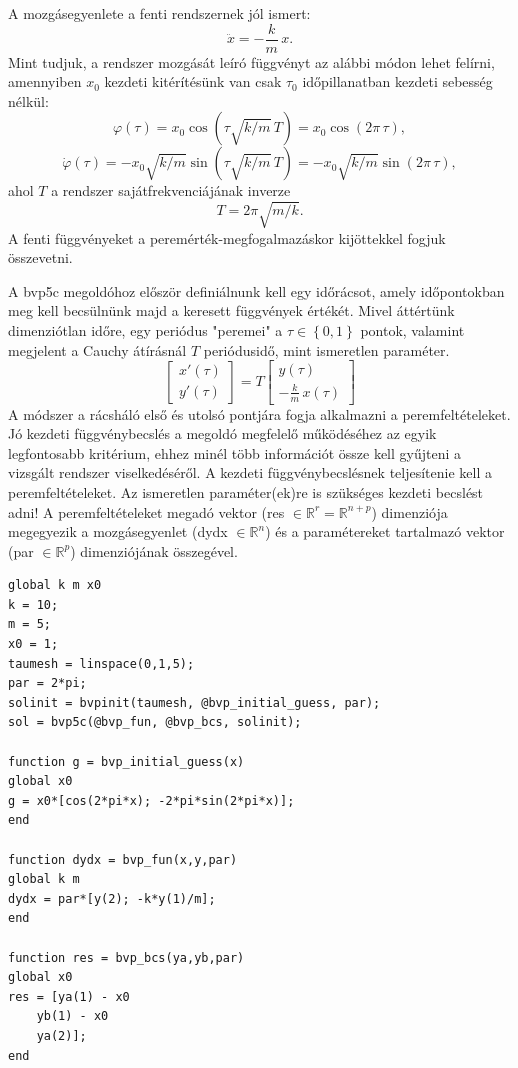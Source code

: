 A mozgásegyenlete a fenti rendszernek jól ismert:
\begin{equation}
\ddot{x}= -\frac{k}{m}\,x.
\end{equation}
Mint tudjuk, a rendszer mozgását leíró függvényt az alábbi módon lehet felírni, amennyiben $x_0$ kezdeti kitérítésünk van csak $\tau_0$ időpillanatban kezdeti sebesség nélkül:
\begin{equation}
\varphi(\tau) = x_0\cos\left(\tau\sqrt{k/m}\,T\right) = x_0\cos\left(2\pi\,\tau\right),
\end{equation}
\begin{equation}
\dot{\varphi}(\tau) = -x_0\sqrt{k/m}\sin\left(\tau\sqrt{k/m}\,T\right) = -x_0\sqrt{k/m}\sin\left(2\pi\,\tau\right),
\end{equation}
ahol $T$ a rendszer sajátfrekvenciájának inverze
\begin{equation}
T = 2\pi\sqrt{m/k}.
\end{equation}
A fenti függvényeket a peremérték-megfogalmazáskor kijöttekkel fogjuk összevetni.

A bvp5c megoldóhoz először definiálnunk kell egy időrácsot, amely i\-dő\-pon\-tok\-ban meg kell becsülnünk majd a keresett függvények értékét.
Mivel áttértünk dimenziótlan időre, egy periódus "peremei" a $\tau \in \left \{ 0,1 \right \}$ pontok, valamint megjelent a Cauchy átírásnál $T$ periódusidő, mint ismeretlen paraméter.
\begin{equation}
\begin{bmatrix}
x'(\tau) \\ y'(\tau)
\end{bmatrix} = 
T
\begin{bmatrix}
y(\tau) \\  -\frac{k}{m}\,x(\tau)
\end{bmatrix} 
\end{equation}
A módszer a rácsháló első és utolsó pontjára fogja alkalmazni a peremfeltételeket.
Jó kezdeti függvénybecslés a megoldó megfelelő működéséhez az egyik legfontosabb kritérium, ehhez minél több információt össze kell gyűjteni a vizsgált rendszer viselkedéséről.
A kezdeti függvénybecslésnek teljesítenie kell a peremfeltételeket.%
Az ismeretlen paraméter(ek)re is szükséges kezdeti becslést adni!
A peremfeltételeket megadó vektor (res $\in \mathbb{R}^r = \mathbb{R}^{n+p}$) dimenziója megegyezik a mozgásegyenlet (dydx $\in \mathbb{R}^n$) és a paramétereket tartalmazó vektor (par $\in \mathbb{R}^p$) dimenziójának összegével.
\begin{lstlisting}
global k m x0
k = 10;
m = 5;
x0 = 1;
taumesh = linspace(0,1,5);
par = 2*pi;
solinit = bvpinit(taumesh, @bvp_initial_guess, par);
sol = bvp5c(@bvp_fun, @bvp_bcs, solinit);

function g = bvp_initial_guess(x)
global x0
g = x0*[cos(2*pi*x); -2*pi*sin(2*pi*x)];
end

function dydx = bvp_fun(x,y,par)
global k m
dydx = par*[y(2); -k*y(1)/m];
end

function res = bvp_bcs(ya,yb,par)
global x0
res = [ya(1) - x0
    yb(1) - x0
    ya(2)];
end
\end{lstlisting}

